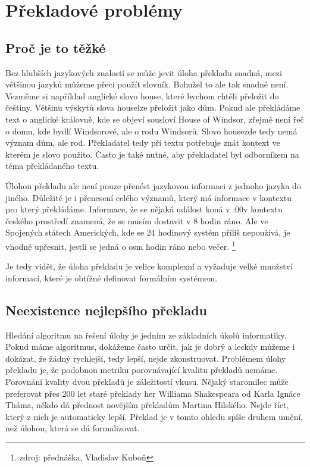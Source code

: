 \documentclass[12pt,a4paper]{report}
\begin{document}
\section{Překladové problémy}

\subsection{Proč je to těžké}
Bez hlubších jazykových znalostí se může jevit úloha překladu snadná, mezi většinou jazyků můžeme přeci použít slovník. Bohužel to ale tak snadné není. Vezměme si například anglické slovo \clqq house\crqq, které bychom chtěli přeložit do češtiny. Většinu výskytů slova \clqq house\crqq lze přeložit jako \clqq dům\crqq . Pokud ale překládáme text o anglické královně, kde se objeví sousloví \clqq House of Windsor\crqq , zřejmě není řeč o domu, kde bydlí Windsorové, ale o \clqq rodu Windsorů\crqq . Slovo \clqq house\crqq  zde tedy nemá význam \clqq dům\crqq , ale \clqq rod\crqq . Překladatel tedy při textu potřebuje znát kontext ve kterém je slovo použito. Často je také nutné, aby překladatel byl odborníkem na téma překládaného textu.

Úlohou překladu ale není pouze přenést jazykovou informaci z jednoho jazyka do jiného. Důležité je i přenesení celého významů, který má informace v kontextu pro který překládáme. Informace, že se nějaká událost koná v :00\crqq  v kontextu českého prostředí znamená, že se musím dostavit v 8 hodin ráno. Ale ve Spojených státech Amerických, kde se 24 hodinový systém příliš nepoužívá, je vhodné upřesnit, jestli se jedná o osm hodin ráno nebo večer. \footnote{zdroj: přednáška, Vladislav Kuboň}

Je tedy vidět, že úloha překladu je velice komplexní a vyžaduje velké množství informací, které je obtížné definovat formálním systémem.


\subsection{Neexistence nejlepšího překladu}
Hledání algoritmu na řešení úlohy je jedním ze základních úkolů informatiky. Pokud máme algoritmus, dokážeme často určit, jak je dobrý a leckdy můžeme i dokázat, že žádný rychlejší, tedy \clqq lepší\crqq , nejde zkonstruovat. Problémem úlohy překladu je, že podobnou metriku porovnávající kvalitu překladů nemáme. Porovnání kvality dvou překladů je záležitostí vkusu. Nějaký staromilec může preferovat přes 200 let staré překlady her Williama Shakespeara od Karla Ignáce Tháma, někdo dá přednost novějším překladům Martina Hilského. Nejde říct, který z nich je automaticky lepší. Překlad je v tomto ohledu spíše druhem umění, než úlohou, která se dá formalizovat.
\end{document}
